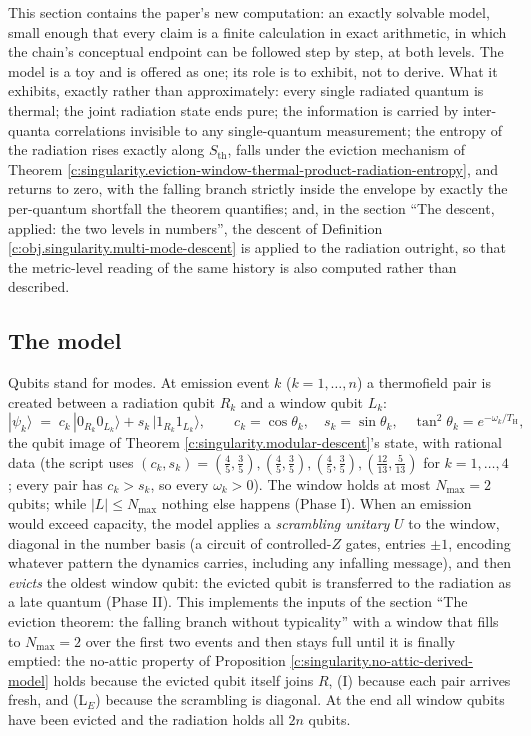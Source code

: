 \documentclass[11pt]{article}
\theoremstyle{definition}
\theoremstyle{plain}
\providecommand{\Sth}{}\renewcommand{\Sth}{S_{\mathrm{th}}}
\providecommand{\TH}{}\renewcommand{\TH}{T_{\mathrm{H}}}
\begin{document}
\label{c:note.singularity.setting-finite-mode-model-dissolution-step}
This section contains the paper's new computation: an exactly solvable model, small enough that every claim is a finite calculation in exact arithmetic, in which the chain's conceptual endpoint can be followed step by step, at both levels. The model is a toy and is offered as one; its role is to exhibit, not to derive. What it exhibits, exactly rather than approximately: every single radiated quantum is thermal; the joint radiation state ends pure; the information is carried by inter-quanta correlations invisible to any single-quantum measurement; the entropy of the radiation rises exactly along $\Sth$, falls under the eviction mechanism of Theorem \ref{c:singularity.eviction-window-thermal-product-radiation-entropy}, and returns to zero, with the falling branch strictly inside the envelope by exactly the per-quantum shortfall the theorem quantifies; and, in the section ``The descent, applied: the two levels in numbers'', the descent of Definition \ref{c:obj.singularity.multi-mode-descent} is applied to the radiation outright, so that the metric-level reading of the same history is also computed rather than described.

\subsection*{The model}
\label{c:note.singularity.setting-model}
Qubits stand for modes. At emission event $k$ ($k = 1, \dots, n$) a thermofield pair is created between a radiation qubit $R_k$ and a window qubit $L_k$:
\[
|\psi_k\rangle \;=\; c_k\,|0_{R_k} 0_{L_k}\rangle + s_k\,|1_{R_k} 1_{L_k}\rangle, \qquad c_k = \cos\theta_k, \quad s_k = \sin\theta_k, \quad \tan^2\theta_k = e^{-\omega_k/\TH} ,
\]
the qubit image of Theorem \ref{c:singularity.modular-descent}'s state, with rational data (the script uses $(c_k, s_k) = (\tfrac45, \tfrac35), (\tfrac45, \tfrac35), (\tfrac45, \tfrac35), (\tfrac{12}{13}, \tfrac{5}{13})$ for $k = 1, \dots, 4$; every pair has $c_k > s_k$, so every $\omega_k > 0$). The window holds at most $N_{\max} = 2$ qubits; while $|L| \leq N_{\max}$ nothing else happens (Phase I). When an emission would exceed capacity, the model applies a \emph{scrambling unitary} $U$ to the window, diagonal in the number basis (a circuit of controlled-$Z$ gates, entries $\pm 1$, encoding whatever pattern the dynamics carries, including any infalling message), and then \emph{evicts} the oldest window qubit: the evicted qubit is transferred to the radiation as a late quantum (Phase II). This implements the inputs of the section ``The eviction theorem: the falling branch without typicality'' with a window that fills to $N_{\max} = 2$ over the first two events and then stays full until it is finally emptied: the no-attic property of Proposition \ref{c:singularity.no-attic-derived-model} holds because the evicted qubit itself joins $R$, (I) because each pair arrives fresh, and (L$_E$) because the scrambling is diagonal. At the end all window qubits have been evicted and the radiation holds all $2n$ qubits.
\end{document}
